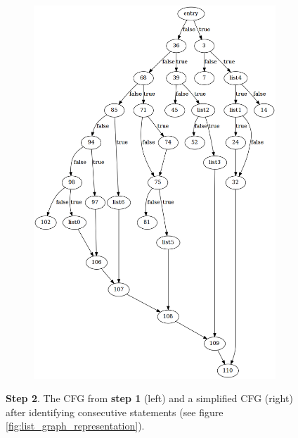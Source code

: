 \begin{figure}[htbp]
\begin{subfigure}[ht]{0.45\textwidth}
		\includegraphics[width=\textwidth]{appendices/control_flow_analysis_example/stmt_2.png}
	\end{subfigure}
	\caption{\textbf{Step 2}. The CFG from \textbf{step 1} (left) and a simplified CFG (right) after identifying consecutive statements (see figure \ref{fig:list_graph_representation}).}
	\label{fig:step_2}
\end{figure}


